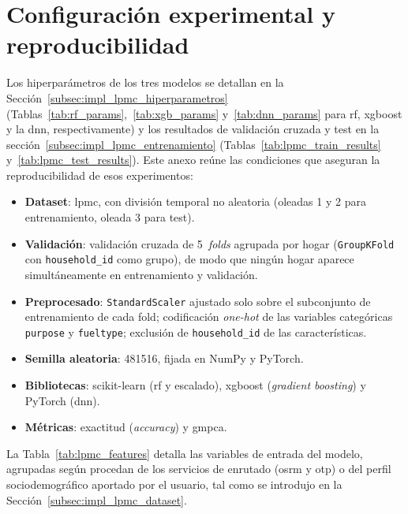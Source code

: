 \section{Configuración experimental y reproducibilidad}
\label{anx:experimentos}

Los hiperparámetros de los tres modelos se detallan en la Sección~\ref{subsec:impl_lpmc_hiperparametros}  (Tablas~\ref{tab:rf_params},~\ref{tab:xgb_params} y~\ref{tab:dnn_params} para \acrlong{rf}, \gls{xgboost} y la \acrlong{dnn}, respectivamente) y los resultados de validación cruzada y test en la sección~\ref{subsec:impl_lpmc_entrenamiento} (Tablas~\ref{tab:lpmc_train_results} y~\ref{tab:lpmc_test_results}). Este anexo reúne las condiciones que aseguran la reproducibilidad de esos experimentos:

\begin{itemize}
  \item \textbf{Dataset}: \acrfull{lpmc}, con división temporal no aleatoria (oleadas 1 y 2 para entrenamiento, oleada 3 para test).
  \item \textbf{Validación}: validación cruzada de 5~\textit{folds} agrupada por hogar (\texttt{GroupKFold} con \texttt{household\_id} como grupo), de modo que ningún hogar aparece simultáneamente en entrenamiento y validación.
  \item \textbf{Preprocesado}: \texttt{StandardScaler} ajustado solo sobre el subconjunto de entrenamiento de cada fold; codificación \textit{one-hot} de las variables categóricas \texttt{purpose} y \texttt{fueltype}; exclusión de \texttt{household\_id} de las características.
  \item \textbf{Semilla aleatoria}: 481516, fijada en NumPy y PyTorch.
  \item \textbf{Bibliotecas}: scikit-learn (\acrlong{rf} y escalado), \gls{xgboost} (\textit{gradient boosting}) y PyTorch (\gls{dnn}).
  \item \textbf{Métricas}: exactitud (\textit{accuracy}) y \gls{gmpca}.
\end{itemize}


La Tabla~\ref{tab:lpmc_features} detalla las variables de entrada del modelo, agrupadas según procedan de los servicios de enrutado (\gls{osrm} y \gls{otp}) o del perfil sociodemográfico aportado por el usuario, tal como se introdujo en la Sección~\ref{subsec:impl_lpmc_dataset}.

